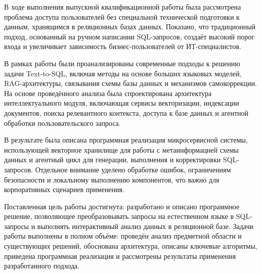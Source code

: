 \conclusion

В ходе выполнения выпускной квалификационной работы была рассмотрена проблема доступа пользователей без специальной технической подготовки к данным, хранящимся в реляционных базах данных. Показано, что традиционный подход, основанный на ручном написании SQL-запросов, создаёт высокий порог входа и увеличивает зависимость бизнес-пользователей от ИТ-специалистов.

В рамках работы были проанализированы современные подходы к решению задачи Text-to-SQL, включая методы на основе больших языковых моделей, RAG-архитектуры, связывания схемы базы данных и механизмов самокоррекции. На основе проведённого анализа была спроектирована архитектура интеллектуального модуля, включающая сервисы векторизации, индексации документов, поиска релевантного контекста, доступа к базе данных и агентной обработки пользовательского запроса.

В результате была описана программная реализация микросервисной системы, использующей векторное хранилище для работы с метаинформацией схемы данных и агентный цикл для генерации, выполнения и корректировки SQL-запросов. Отдельное внимание уделено обработке ошибок, ограничениям безопасности и локальному выполнению компонентов, что важно для корпоративных сценариев применения.

Поставленная цель работы достигнута: разработано и описано программное решение, позволяющее преобразовывать запросы на естественном языке в SQL-запросы и выполнять интерактивный анализ данных в реляционной базе. Задачи работы выполнены в полном объёме: проведён анализ предметной области и существующих решений, обоснована архитектура, описаны ключевые алгоритмы, приведена программная реализация и рассмотрены результаты применения разработанного подхода.
